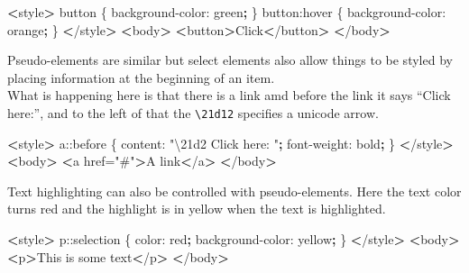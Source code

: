 \documentclass[]{book}
\newenvironment{Shaded}{\begin{snugshade}}{\end{snugshade}}
\newcommand{\ExtensionTok}[1]{#1}
\newcommand{\KeywordTok}[1]{\textcolor[rgb]{0.13,0.29,0.53}{\textbf{#1}}}
\newcommand{\NormalTok}[1]{#1}
\newcommand{\OperatorTok}[1]{\textcolor[rgb]{0.81,0.36,0.00}{\textbf{#1}}}
\newcommand{\StringTok}[1]{\textcolor[rgb]{0.31,0.60,0.02}{#1}}
\begin{document}
\begin{Shaded}
\begin{Highlighting}[]
\OperatorTok{<}\ExtensionTok{style}\OperatorTok{>}
    \ExtensionTok{button}\NormalTok{ \{}
        \ExtensionTok{background-color}\NormalTok{: green}\KeywordTok{;}
\NormalTok{    \}}
    \ExtensionTok{button}\NormalTok{:hover \{}
        \ExtensionTok{background-color}\NormalTok{: orange}\KeywordTok{;}
\NormalTok{    \}}
\OperatorTok{<}\NormalTok{/}\ExtensionTok{style}\OperatorTok{>}
\OperatorTok{<}\ExtensionTok{body}\OperatorTok{>}
    \OperatorTok{<}\ExtensionTok{button}\OperatorTok{>}\NormalTok{Click}\OperatorTok{<}\NormalTok{/button}\OperatorTok{>}
\OperatorTok{<}\NormalTok{/}\ExtensionTok{body}\OperatorTok{>}
\end{Highlighting}
\end{Shaded}

Pseudo-elements are similar but select elements also allow things to be styled by placing information at the beginning of an item.\\
What is happening here is that there is a link amd before the link it says ``Click here:'', and to the left of that the \texttt{\textbackslash{}21d12} specifies a unicode arrow.

\begin{Shaded}
\begin{Highlighting}[]
\OperatorTok{<}\ExtensionTok{style}\OperatorTok{>}
    \ExtensionTok{a}\NormalTok{::before \{}
        \ExtensionTok{content}\NormalTok{: }\StringTok{"\textbackslash{}21d2 Click here: "}\KeywordTok{;}
        \ExtensionTok{font-weight}\NormalTok{: bold}\KeywordTok{;}
\NormalTok{    \}}
\OperatorTok{<}\NormalTok{/}\ExtensionTok{style}\OperatorTok{>}
\OperatorTok{<}\ExtensionTok{body}\OperatorTok{>}
    \OperatorTok{<}\ExtensionTok{a}\NormalTok{ href=}\StringTok{"#"}\OperatorTok{>}\NormalTok{A link}\OperatorTok{<}\NormalTok{/a}\OperatorTok{>}
\OperatorTok{<}\NormalTok{/}\ExtensionTok{body}\OperatorTok{>}
\end{Highlighting}
\end{Shaded}

Text highlighting can also be controlled with pseudo-elements. Here the text color turns red and the highlight is in yellow when the text is highlighted.

\begin{Shaded}
\begin{Highlighting}[]
\OperatorTok{<}\ExtensionTok{style}\OperatorTok{>}
    \ExtensionTok{p}\NormalTok{::selection \{}
        \ExtensionTok{color}\NormalTok{: red}\KeywordTok{;}
        \ExtensionTok{background-color}\NormalTok{: yellow}\KeywordTok{;}
\NormalTok{    \}}
\OperatorTok{<}\NormalTok{/}\ExtensionTok{style}\OperatorTok{>}
\OperatorTok{<}\ExtensionTok{body}\OperatorTok{>}
    \OperatorTok{<}\ExtensionTok{p}\OperatorTok{>}\NormalTok{This is some text}\OperatorTok{<}\NormalTok{/p}\OperatorTok{>}
\OperatorTok{<}\NormalTok{/}\ExtensionTok{body}\OperatorTok{>}
\end{Highlighting}
\end{Shaded}
\end{document}
